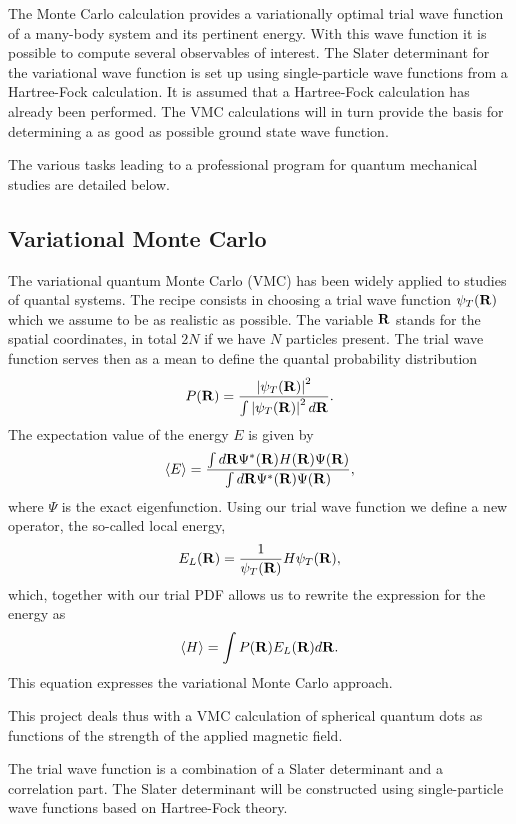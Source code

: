 \documentclass[oneside,final,a4wide,10pt]{article}
\newcommand{\be}{\begin{equation}}
\newcommand{\ee}{\end{equation}}
\begin{document}
The Monte Carlo calculation
provides a variationally optimal trial wave function
of a many-body system and its pertinent energy. With this wave function it is possible to compute 
several observables of interest.
The Slater determinant for the variational wave function is set up using
single-particle wave functions from a Hartree-Fock calculation. It is assumed that a Hartree-Fock calculation has already been performed. 
The VMC calculations will in turn provide the basis for determining a as good as possible
ground state wave function. 

The various tasks leading to a professional program for quantum mechanical studies are detailed below.



\subsection*{Variational Monte Carlo}
The variational quantum Monte Carlo (VMC) has been widely applied 
to studies of quantal systems. 
The recipe consists in choosing 
a trial wave function
$\psi_T({\bf R})$ which we assume to be as realistic as possible. 
The variable ${\bf R}$ stands for the spatial coordinates, in total 
$2N$ if we have $N$ particles present. 
The trial wave function serves then as
a mean to define the quantal probability distribution 
\be
   P({\bf R})= \frac{\left|\psi_T({\bf R})\right|^2}{\int \left|\psi_T({\bf R})\right|^2d{\bf R}}.
\ee
The expectation value of the energy $E$
is given by
\be
   \langle E \rangle =
   \frac{\int d{\bf R}\Psi^{\ast}({\bf R})H({\bf R})\Psi({\bf R})}
        {\int d{\bf R}\Psi^{\ast}({\bf R})\Psi({\bf R})},
\ee
where $\Psi$ is the exact eigenfunction. Using our trial
wave function we define a new operator, 
the so-called  
local energy, 
\be
   E_L({\bf R})=\frac{1}{\psi_T({\bf R})}H\psi_T({\bf R}),
   \label{eq:locale1}
\ee
which, together with our trial PDF allows us to rewrite the 
expression for the energy as
\be
  \langle H \rangle =\int P({\bf R})E_L({\bf R}) d{\bf R}.
  \label{eq:vmc1}
\ee
This equation expresses the variational Monte Carlo approach.

This project deals thus with a VMC calculation of 
spherical quantum dots as functions of the strength of the applied magnetic field.

The trial wave function is a combination of a Slater determinant 
and a correlation part. The Slater determinant will be constructed
using single-particle
wave functions based on Hartree-Fock theory.
\end{document}
